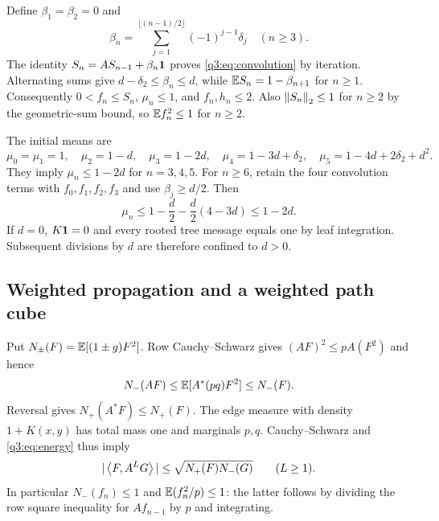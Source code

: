 Define $\beta_1=\beta_2=0$ and
\[
 \beta_n=\sum_{j=1}^{\lfloor(n-1)/2\rfloor}(-1)^{j-1}\delta_{j}\quad(n\ge3).
\]
The identity $S_n=AS_{n-1}+\beta_n\mathbf1$ proves \eqref{q3:eq:convolution} by iteration. Alternating sums give $d-\delta_{2}\le\beta_n\le d$, while $\mathbb E S_n=1-\beta_{n+1}$ for $n\ge1$. Consequently $0<f_n\le S_n$, $\mu_n\le1$, and $f_n,h_n\le2$. Also $\left\lVert S_n\right\rVert_2\le1$ for $n\ge2$ by the geometric-sum bound, so $\mathbb E f_n^2\le1$ for $n\ge2$.

The initial means are
\[
 \mu_0=\mu_1=1,\quad \mu_2=1-d,\quad\mu_3=1-2d,\quad
 \mu_4=1-3d+\delta_{2},\quad\mu_5=1-4d+2\delta_{2}+d^2.
\]
They imply $\mu_n\le1-2d$ for $n=3,4,5$. For $n\ge6$, retain the four convolution terms with $f_0,f_1,f_2,f_3$ and use $\beta_j\ge d/2$. Then
\[
 \mu_n\le1-\frac d2-\frac d2(4-3d)\le1-2d.
\]
If $d=0$, $K\mathbf1=0$ and every rooted tree message equals one by leaf integration. Subsequent divisions by $d$ are therefore confined to $d>0$.

\subsection{Weighted propagation and a weighted path cube}
Put $N_\pm(F)=\mathbb E[(1\pm g)F^2]$. Row Cauchy--Schwarz gives $(AF)^2\le pA(F^2)$ and hence
\begin{equation}\label{q3:eq:energy}
 N_-(AF)\le\mathbb E[A^*(pq)F^2]\le N_-(F).
\end{equation}
Reversal gives $N_+(A^*F)\le N_+(F)$. The edge measure with density $1+K(x,y)$ has total mass one and marginals $p,q$. Cauchy--Schwarz and \eqref{q3:eq:energy} thus imply
\begin{equation}\label{q3:eq:bilinear}
 |\left\langle F,A^LG\right\rangle|\le\sqrt{N_+(F)N_-(G)}\qquad(L\ge1).
\end{equation}
In particular $N_-(f_n)\le1$ and $\mathbb E(f_n^2/p)\le1$: the latter follows by dividing the row square inequality for $Af_{n-1}$ by $p$ and integrating.

